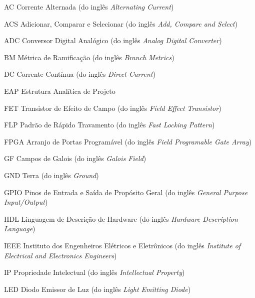 \documentclass[
	12pt,				%
	openright,			%
	oneside,			%
	a4paper,			%
	hyphens,			%
	english,			%
	brazil				%
]{abntex2}
\newcommand{\listofcharts}{\listof{chart}{Lista de Gráficos}}
\begin{document}
	

	\listoffigures*
	\cleardoublepage

	\listofcharts
	\cleardoublepage

	\listoftables*
	\cleardoublepage

	\begin{siglas}
		\item[AC] Corrente Alternada (do inglês \emph{Alternating Current})
		\item[ACS] Adicionar, Comparar e Selecionar (do inglês \emph{Add, Compare and Select})
		\item[ADC] Conversor Digital Analógico (do inglês \emph{Analog Digital Converter})
		\item[BM] Métrica de Ramificação (do inglês \emph{Branch Metrics})
		\item[DC] Corrente Contínua (do inglês \emph{Direct Current})
		\item[EAP] Estrutura Analítica de Projeto
		\item[FET] Transistor de Efeito de Campo (do inglês \emph{Field Effect Transistor})
		\item[FLP] Padrão de Rápido Travamento (do inglês \emph{Fast Locking Pattern})
		\item[FPGA] Arranjo de Portas Programável (do inglês \emph{Field Programable Gate Array})
		\item[GF] Campos de Galois (do inglês \emph{Galois Field})
		\item[GND] Terra (do inglês \emph{Ground})
		\item[GPIO] Pinos de Entrada e Saída de Propósito Geral (do inglês \emph{General Purpose Input/Output})
		\item[HDL] Linguagem de Descrição de Hardware (do inglês \emph{Hardware Description Language})
		\item[IEEE] Instituto dos Engenheiros Elétricos e Eletrônicos (do inglês \emph{Institute of Electrical and Electronics Engineers})
		\item[IP] Propriedade Intelectual (do inglês \emph{Intellectual Property})
		\item[LED] Diodo Emissor de Luz (do inglês \emph{Light Emitting Diode})

\end{siglas}
\end{document}
